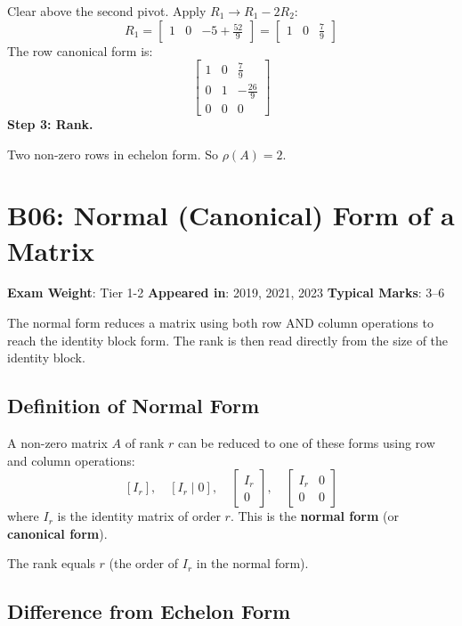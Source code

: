 \documentclass[
]{article}
\renewenvironment{quote}
  {\begin{tcolorbox}[
     colback=calloutbg,
     colframe=calloutframe,
     colupper=callouttext,
     arc=3pt,
     boxrule=0.5pt,
     leftrule=0.5pt,
     borderline west={3pt}{0pt}{calloutaccent},
     left=8pt,
     right=8pt,
     top=6pt,
     bottom=6pt
   ]}
  {\end{tcolorbox}}
\begin{document}
Clear above the second pivot. Apply \(R_1 \to R_1 - 2R_2\):
\[
R_1 = \begin{bmatrix} 1 & 0 & -5 + \frac{52}{9} \end{bmatrix} = \begin{bmatrix} 1 & 0 & \frac{7}{9} \end{bmatrix}
\]
The row canonical form is:
\[
\begin{bmatrix}
1 & 0 & \frac{7}{9} \\
0 & 1 & -\frac{26}{9} \\
0 & 0 & 0
\end{bmatrix}
\]
\textbf{Step 3: Rank.}

Two non-zero rows in echelon form. So \(\rho(A) = 2\).

\section{B06: Normal (Canonical) Form of a
Matrix}\label{b06-normal-canonical-form-of-a-matrix}

\begin{quote}
\textbf{Exam Weight}: Tier 1-2 \textbar{} \textbf{Appeared in}: 2019,
2021, 2023 \textbar{} \textbf{Typical Marks}: 3--6
\end{quote}

The normal form reduces a matrix using both row AND column operations to
reach the identity block form. The rank is then read directly from the
size of the identity block.

\subsection{Definition of Normal Form}\label{definition-of-normal-form}

A non-zero matrix \(A\) of rank \(r\) can be reduced to one of these
forms using row and column operations:
\[
[I_r], \quad [I_r \mid 0], \quad
\begin{bmatrix}
I_r \\
0
\end{bmatrix}, \quad \begin{bmatrix} I_r & 0 \\ 0 & 0 \end{bmatrix}
\]
where \(I_r\) is the identity matrix of order \(r\). This is the
\textbf{normal form} (or \textbf{canonical form}).

The rank equals \(r\) (the order of \(I_r\) in the normal form).

\subsection{Difference from Echelon
Form}\label{difference-from-echelon-form}
\end{document}
